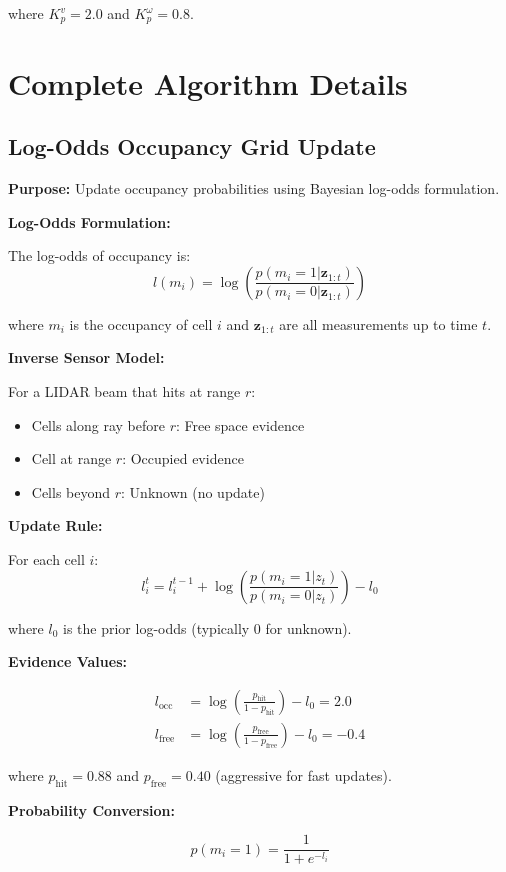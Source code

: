 \documentclass[11pt]{article}
\begin{document}
where $K_p^v = 2.0$ and $K_p^\omega = 0.8$.

\section{Complete Algorithm Details}

\subsection{Log-Odds Occupancy Grid Update}

\textbf{Purpose:} Update occupancy probabilities using Bayesian log-odds formulation.

\textbf{Log-Odds Formulation:}

The log-odds of occupancy is:
\[
l(m_i) = \log\left(\frac{p(m_i = 1 | \mathbf{z}_{1:t})}{p(m_i = 0 | \mathbf{z}_{1:t})}\right)
\]

where $m_i$ is the occupancy of cell $i$ and $\mathbf{z}_{1:t}$ are all measurements up to time $t$.

\textbf{Inverse Sensor Model:}

For a LIDAR beam that hits at range $r$:
\begin{itemize}
    \item Cells along ray before $r$: Free space evidence
    \item Cell at range $r$: Occupied evidence
    \item Cells beyond $r$: Unknown (no update)
\end{itemize}

\textbf{Update Rule:}

For each cell $i$:
\[
l_i^{t} = l_i^{t-1} + \log\left(\frac{p(m_i = 1 | z_t)}{p(m_i = 0 | z_t)}\right) - l_0
\]

where $l_0$ is the prior log-odds (typically 0 for unknown).

\textbf{Evidence Values:}

\begin{align}
l_{\text{occ}} &= \log\left(\frac{p_{\text{hit}}}{1 - p_{\text{hit}}}\right) - l_0 = 2.0 \\
l_{\text{free}} &= \log\left(\frac{p_{\text{free}}}{1 - p_{\text{free}}}\right) - l_0 = -0.4
\end{align}

where $p_{\text{hit}} = 0.88$ and $p_{\text{free}} = 0.40$ (aggressive for fast updates).

\textbf{Probability Conversion:}

\[
p(m_i = 1) = \frac{1}{1 + e^{-l_i}}
\]
\end{document}
